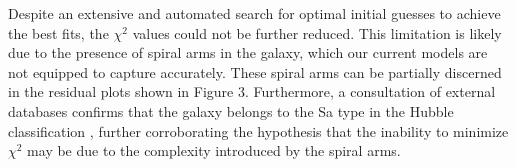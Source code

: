Despite an extensive and automated search for optimal initial guesses to achieve the best fits, the \(\chi^{2}\) values could not be further reduced. This limitation is likely due to the presence of spiral arms in the galaxy, which our current models are not equipped to capture accurately. These spiral arms can be partially discerned in the residual plots shown in Figure 3. Furthermore, a consultation of external databases confirms that the galaxy belongs to the Sa type in the Hubble classification \citep{ned}, further corroborating the hypothesis that the inability to minimize \(\chi^{2}\) may be due to the complexity introduced by the spiral arms.


